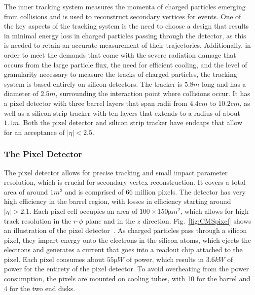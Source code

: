 The inner tracking system measures the momenta of charged particles emerging from collisions and is used to reconstruct secondary vertices for events.
One of the key aspects of the tracking system is the need to choose a design that results in minimal energy loss in charged particles passing through the detector, as this is needed to retain an accurate measurement of their trajectories. %
Additionally, in order to meet the demands that come with the severe radiation damage that occurs from the large particle flux, the need for efficient cooling, and the level of granularity necessary to measure the tracks of charged particles, the tracking system is based entirely on silicon detectors.
The tracker is $5.8\unit{m}$ long and has a diameter of $2.5\unit{m}$, surrounding the interaction point where collisions occur.
It has a pixel detector with three barrel layers that span radii from $4.4\unit{cm}$ to $10.2\unit{cm}$, as well as a silicon strip tracker with ten layers that extends to a radius of about $1.1\unit{m}$.
Both the pixel detector and silicon strip tracker have endcaps that allow for an acceptance of $|\eta|<2.5$.

\subsubsection{The Pixel Detector}

The pixel detector allows for precise tracking and small impact parameter resolution, which is crucial for secondary vertex reconstruction.
It covers a total area of around $1\unit{m^2}$ and is comprised of 66 million pixels.
The detector has very high efficiency in the barrel region, with losses in efficiency starting around $|\eta|>2.1$. %
Each pixel cell occupies an area of $100\times150\unit{\micro m^2}$, which allows for high track resolution in the $r$-$\phi$ plane and in the $z$ direction.
Fig.~\ref{fig:CMSpixel} shows an illustration of the pixel detector~\cite{Collaboration_2010_pixel}.
As charged particles pass through a silicon pixel, they impart energy onto the electrons in the silicon atoms, which ejects the electrons and generates a current that goes into a readout chip attached to the pixel.
Each pixel consumes about $55\unit{\micro W}$ of power, which results in $3.6\unit{kW}$ of power for the entirety of the pixel detector.
To avoid overheating from the power consumption, the pixels are mounted on cooling tubes, with 10 for the barrel and 4 for the two end disks.

